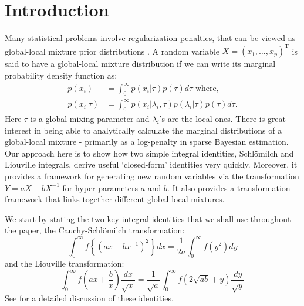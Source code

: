\documentclass[lineno]{biometrika}
\def\T{{ \mathrm{\scriptscriptstyle T} }}
\begin{document}
\section{Introduction}
Many statistical problems involve regularization penalties, that can be viewed as global-local mixture prior distributions \citep{polson2011data, hans2011comment}. A random variable $X = (x_1, \ldots, x_p)^{\T}$ is said to have a global-local mixture distribution if we can write its marginal probability density function as: 
\begin{align*}
p(x_i) & = \int_{0}^{\infty} p(x_i | \tau) p(\tau) d\tau \mbox{ where, }\\
p( x_i | \tau) & = \int_{0}^{\infty} p(x_i | \lambda_i, \tau) p(\lambda_i | \tau) p(\tau) d\tau.
\end{align*}
Here $\tau$ is a global mixing parameter and $\lambda_i$'s are the local ones. There is great interest in being able to analytically calculate the marginal distributions of a global-local mixture - primarily as a log-penalty in sparse Bayesian estimation. Our approach here is to show how two simple integral identities, Schl\"omilch and Liouville integrals, derive useful `closed-form' identities very quickly. Moreover. it provides a framework for generating new random variables via the transformation $Y = a X - b X^{-1}$ for hyper-parameters $a$ and $b$. It also provides a transformation framework that links together different global-local mixtures. 

We start by stating the two key integral identities that we shall use throughout the paper, the Cauchy-Schl\"omilch transformation: 
\begin{equation}
\int_0^\infty f \left\{ ( a x - b x^{-1} )^2 \right\} d x = \frac{1}{2a} \int_0^\infty f(y^2) d y \label{eq:identity}
\end{equation}
and the Liouville transformation:
\begin{equation}
\int_{0}^{\infty} f\left(ax + \frac{b}{x} \right) \frac{dx}{\sqrt{x}} = \frac{1}{\sqrt{a}} \int_{0}^{\infty} f \left( 2\sqrt{ab} + y \right) \frac{dy}{\sqrt{y}} \label{eq:liouville}
\end{equation}
See \citep{boros2006irresistible,baker2008probabilistic,jones2014generating} for a detailed discussion of these identities. 
\end{document}
